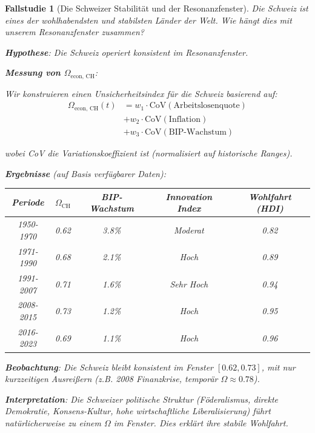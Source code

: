 \documentclass[a4paper, 12pt, twoside, openright]{report}
\newtheorem{fallstudie}{Fallstudie}
\theoremstyle{definition}
\theoremstyle{definition}
\begin{document}
\begin{fallstudie}[Die Schweizer Stabilität und der Resonanzfenster]

Die Schweiz ist eines der wohlhabendsten und stabilsten Länder der Welt. Wie hängt dies mit unserem Resonanzfenster zusammen?

\textbf{Hypothese}: Die Schweiz operiert konsistent im Resonanzfenster.

\textbf{Messung von $\Omega_{\text{econ, CH}}$}:

Wir konstruieren einen Unsicherheitsindex für die Schweiz basierend auf:
\begin{align}
\Omega_{\text{econ, CH}}(t) &= w_1 \cdot \text{CoV}(\text{Arbeitslosenquote})\\ &+ w_2 \cdot \text{CoV}(\text{Inflation})\\ &+ w_3 \cdot \text{CoV}(\text{BIP-Wachstum})
\end{align}

wobei CoV die Variationskoeffizient ist (normalisiert auf historische Ranges).

\textbf{Ergebnisse} (auf Basis verfügbarer Daten):

\begin{table}[h]
\centering
\begin{tabular}{ccccc}
\hline
Periode & $\Omega_{\text{CH}}$ & BIP-Wachstum & Innovation Index & Wohlfahrt (HDI) \\
\hline
1950-1970 & 0.62 & 3.8\% & Moderat & 0.82 \\
1971-1990 & 0.68 & 2.1\% & Hoch & 0.89 \\
1991-2007 & 0.71 & 1.6\% & Sehr Hoch & 0.94 \\
2008-2015 & 0.73 & 1.2\% & Hoch & 0.95 \\
2016-2023 & 0.69 & 1.1\% & Hoch & 0.96 \\
\hline
\end{tabular}
\end{table}

\textbf{Beobachtung}: Die Schweiz bleibt konsistent im Fenster $[0.62, 0.73]$, mit nur kurzzeitigen Ausreißern (z.B. 2008 Finanzkrise, temporär $\Omega \approx 0.78$).

\textbf{Interpretation}: Die Schweizer politische Struktur (Föderalismus, direkte Demokratie, Konsens-Kultur, hohe wirtschaftliche Liberalisierung) führt natürlicherweise zu einem $\Omega$ im Fenster. Dies erklärt ihre stabile Wohlfahrt.

\end{fallstudie}
\end{document}
